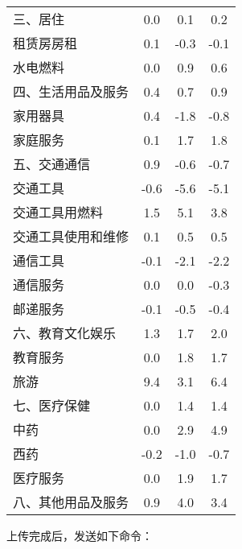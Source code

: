 \begin{table}[h]
\begin{tabular}{lccc}
        三、居住 & 0.0 & 0.1 & 0.2 \\[-3pt]
        租赁房房租 & 0.1 & -0.3 & -0.1 \\[-3pt]
        水电燃料 & 0.0 & 0.9 & 0.6 \\[-3pt]
        \midrule
        四、生活用品及服务 & 0.4 & 0.7 & 0.9 \\[-3pt]
        家用器具 & 0.4 & -1.8 & -0.8 \\[-3pt]
        家庭服务 & 0.1 & 1.7 & 1.8 \\[-3pt]
        \midrule
        五、交通通信 & 0.9 & -0.6 & -0.7 \\[-3pt]
        交通工具 & -0.6 & -5.6 & -5.1 \\[-3pt]
        交通工具用燃料 & 1.5 & 5.1 & 3.8 \\[-3pt]
        交通工具使用和维修 & 0.1 & 0.5 & 0.5 \\[-3pt]
        通信工具 & -0.1 & -2.1 & -2.2 \\[-3pt]
        通信服务 & 0.0 & 0.0 & -0.3 \\[-3pt]
        邮递服务 & -0.1 & -0.5 & -0.4 \\[-3pt]
        \midrule
        六、教育文化娱乐 & 1.3 & 1.7 & 2.0 \\[-3pt]
        教育服务 & 0.0 & 1.8 & 1.7 \\[-3pt]
        旅游 & 9.4 & 3.1 & 6.4 \\[-3pt]
        \midrule
        七、医疗保健 & 0.0 & 1.4 & 1.4 \\[-3pt]
        中药 & 0.0 & 2.9 & 4.9 \\[-3pt]
        西药 & -0.2 & -1.0 & -0.7 \\[-3pt]
        医疗服务 & 0.0 & 1.9 & 1.7 \\[-3pt]
        \midrule
        八、其他用品及服务 & 0.9 & 4.0 & 3.4 \\[-3pt]
        \bottomrule
    \end{tabular}
    \label{tab:1-7}
\end{table}
\FloatBarrier

上传完成后，发送如下命令：


